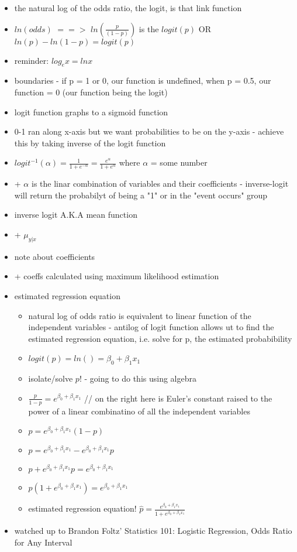 \documentclass[12pt]{article}
\begin{document}
\begin{itemize}
    \item the natural log of the odds ratio, the logit, is that link function
    \item $ln(odds)$ $==>$ $ln(\frac{p}{(1-p)})$ is the $logit(p)$ OR $ln(p) - ln(1-p) = logit(p)$
    \item reminder: $log_{e}x = lnx$
    \item boundaries - if p = 1 or 0, our function is undefined, when p = 0.5, our function = 0 (our function being the logit)
    \item logit function graphs to a sigmoid function
    \item 0-1 ran along x-axis but we want probabilities to be on the y-axis - achieve this by taking inverse of the logit function
    \item $logit^{-1}(\alpha) = \frac{1}{1+e^{-\alpha}} = \frac{e^{\alpha}}{1+e^{\alpha}}$ where $\alpha$ = some number
    \item   + $\alpha$ is the linar combination of variables and their coefficients - inverse-logit will return the probabilyt of being a "1" or in the "event occurs" group
    \item inverse logit A.K.A mean function
    \item   + $\mu_{y|x}$
    \item note about coefficients
    \item   + coeffs calculated using maximum likelihood estimation
    \item estimated regression equation
        \begin{itemize}
            \item natural log of odds ratio is equivalent to linear function of the independent variables - antilog of logit function allows ut to find the estimated regression equation, i.e. solve for p, the estimated probabibility
            \item $logit(p) = ln()= \beta_{0} + \beta_{1}x_{1}$
            \item isolate/solve $p$! - going to do this using algebra
            \item $\frac{p}{1-p} = e^{\beta_{0} + \beta_{1}x_{1}}$ // on the right here is Euler's constant raised to the power of a linear combinatino of all the independent variables
            \item $p = e^{\beta_{0}+\beta_{1}x_{1}}(1-p)$
            \item $p = e^{\beta_{0}+\beta_{1}x_{1}} - e^{\beta_{0}+\beta_{1}x_{1}}p $
            \item $p + e^{\beta_{0}+\beta_{1}x_{1}}p = e^{\beta_{0}+\beta_{1}x_{1}}$
            \item $p(1+e^{\beta_{0}+\beta_{1}x_{1}}) = e^{\beta_{0}+\beta_{1}x_{1}}$
            \item estimated regression equation! $\hat{p} = \frac{e^{\beta_{0}+\beta_{1}x_{1}}}{1+e^{\beta_{0}+\beta_{1}x_{1}}}$
        \end{itemize}
    \item watched up to Brandon Foltz' Statistics 101: Logistic Regression, Odds Ratio for Any Interval
\end{itemize}
\end{document}
